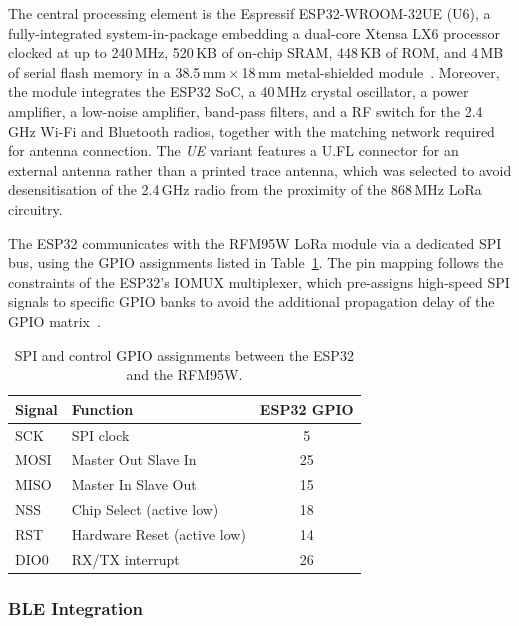 \documentclass[english,bachelor]{tfgitic}[2026/01/22]
\begin{document}
The central processing element is the Espressif ESP32-WROOM-32UE (U6), a
fully-integrated system-in-package embedding a dual-core Xtensa LX6 processor
clocked at up to 240\,MHz, 520\,KB of on-chip SRAM, 448\,KB of ROM, and 4\,MB of
serial flash memory in a 38.5\,mm\,$\times$\,18\,mm metal-shielded
module~\cite{espressif2023esp32wroom, espressif2023esp32trm}. Moreover, the module integrates
the ESP32 SoC, a 40\,MHz crystal oscillator, a power amplifier, a low-noise
amplifier, band-pass filters, and a RF switch for the 2.4\,GHz Wi-Fi and Bluetooth
radios, together with the matching network required for antenna connection. The
\emph{UE} variant features a U.FL connector for an external antenna rather than a
printed trace antenna, which was selected to avoid desensitisation of the 2.4\,GHz
radio from the proximity of the 868\,MHz LoRa circuitry.

The ESP32 communicates with the RFM95W LoRa module via a dedicated SPI bus, using
the GPIO assignments listed in Table~\ref{tab:hw_spi}. The pin mapping follows the constraints of the ESP32's IOMUX
multiplexer, which pre-assigns high-speed SPI signals to specific GPIO banks to
avoid the additional propagation delay of the GPIO matrix~\cite{espressif2023esp32trm}.

\begin{table}[htbp]
    \centering
    \caption{SPI and control GPIO assignments between the ESP32 and the RFM95W.}
    \label{tab:hw_spi}
    \begin{tabular}{llc}
        \toprule
        Signal & Function & ESP32 GPIO \\
        \midrule
        SCK   & SPI clock                  & 5  \\
        MOSI  & Master Out Slave In        & 25 \\
        MISO  & Master In Slave Out        & 15 \\
        NSS   & Chip Select (active low)   & 18 \\
        RST   & Hardware Reset (active low)& 14 \\
        DIO0  & RX/TX interrupt            & 26 \\
        \bottomrule
    \end{tabular}
\end{table}

\subsubsection{BLE Integration}
\label{subsec:hw_ble}
\end{document}
